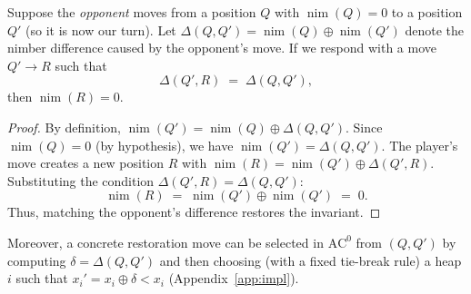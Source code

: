 \documentclass[twoside,11pt]{article}
\newcommand{\AC}{\mathrm{AC}}
\numberwithin{theorem}{section}
\numberwithin{equation}{section}
\begin{document}
\begin{proposition}
\label{prop:restore}
Suppose the \emph{opponent} moves from a position $Q$ with $\operatorname{nim}(Q)=0$ to a position $Q'$ (so it is now our turn).
Let $\Delta(Q,Q')=\operatorname{nim}(Q)\oplus \operatorname{nim}(Q')$ denote the nimber difference caused by the opponent's move.
If we respond with a move $Q' \to R$ such that
\[
\Delta(Q',R) \;=\; \Delta(Q,Q'),
\]
then $\operatorname{nim}(R)=0$.
\end{proposition}

\begin{proof}
By definition, $\operatorname{nim}(Q') = \operatorname{nim}(Q) \oplus \Delta(Q,Q')$.
Since $\operatorname{nim}(Q)=0$ (by hypothesis), we have $\operatorname{nim}(Q') = \Delta(Q,Q')$.
The player's move creates a new position $R$ with $\operatorname{nim}(R) = \operatorname{nim}(Q') \oplus \Delta(Q',R)$.
Substituting the condition $\Delta(Q',R) = \Delta(Q,Q')$:
\[
\operatorname{nim}(R) \;=\; \operatorname{nim}(Q') \oplus \operatorname{nim}(Q') \;=\; 0.
\]
Thus, matching the opponent's difference restores the invariant.
\end{proof}

Moreover, a concrete restoration move can be selected in $\AC^0$ from $(Q,Q')$ by computing $\delta=\Delta(Q,Q')$ and then choosing (with a fixed tie-break rule) a heap $i$ such that $x_i' = x_i \oplus \delta < x_i$ (Appendix~\ref{app:impl}).
\end{document}
